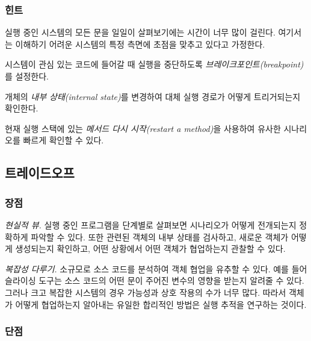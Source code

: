 \documentclass[a4paper,10pt,twoside]{book}
\begin{document}
\subsubsection*{힌트}

실행 중인 시스템의 모든 문을 일일이 살펴보기에는 시간이 너무 많이 걸린다. 여기서는 이해하기 어려운 시스템의 특정 측면에 초점을 맞추고 있다고 가정한다.

\begin{bulletlist}
\item 시스템이 관심 있는 코드에 들어갈 때 실행을 중단하도록 \emph{브레이크포인트(breakpoint)}를 설정한다.

\item 개체의 \emph{내부 상태(internal state)}를 변경하여 대체 실행 경로가 어떻게 트리거되는지 확인한다.

\item 현재 실행 스택에 있는 \emph{메서드 다시 시작(restart a method)}을 사용하여 유사한 시나리오를 빠르게 확인할 수 있다.
\end{bulletlist}

\subsection*{트레이드오프}

\subsubsection*{장점}

\begin{bulletlist}
\item \emph{현실적 뷰.}
실행 중인 프로그램을 단계별로 살펴보면 시나리오가 어떻게 전개되는지 정확하게 파악할 수 있다. 또한 관련된 객체의 내부 상태를 검사하고, 새로운 객체가 어떻게 생성되는지 확인하고, 어떤 상황에서 어떤 객체가 협업하는지 관찰할 수 있다.

\item \emph{복잡성 다루기.}
소규모로 소스 코드를 분석하여 객체 협업을 유추할 수 있다. 예를 들어 슬라이싱 도구는 소스 코드의 어떤 문이 주어진 변수의 영향을 받는지 알려줄 수 있다. 그러나 크고 복잡한 시스템의 경우 가능성과 상호 작용의 수가 너무 많다. 따라서 객체가 어떻게 협업하는지 알아내는 유일한 합리적인 방법은 실행 추적을 연구하는 것이다.
\end{bulletlist}

\subsubsection*{단점}
\end{document}
